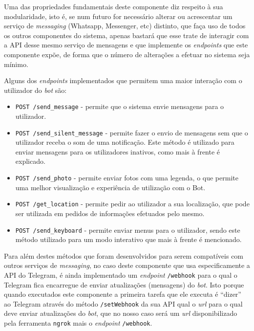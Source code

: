 \documentclass[11pt,a4paper]{article}
\begin{document}
Uma das propriedades fundamentais deste componente diz respeito à sua modularidade, isto é, se num futuro
for necessário alterar ou acrescentar um serviço de \emph{messaging} (Whatsapp, Messenger, etc) distinto,
que faça uso de todos os outros componentes do sistema, apenas bastará que esse trate de interagir com a API
desse mesmo serviço de mensagens e que implemente os \emph{endpoints} que este componente expõe, de forma
que o número de alterações a efetuar no sistema seja mínimo.

Alguns dos \emph{endpoints} implementados que permitem uma maior interação com o utilizador do \textit{bot} 
são:

\begin{itemize}
    \item \texttt{POST /send\_message} - permite que o sistema envie mensagens para o utilizador.
    \item \texttt{POST /send\_silent\_message} - permite fazer o envio de mensagens sem que o utilizador
      receba o som de uma notificação. Este método é utilizado para enviar mensagens para os utilizadores
      inativos, como mais à frente é explicado.
    \item \texttt{POST /send\_photo} - permite enviar fotos com uma legenda, o que permite uma melhor
      visualização e experiência de utilização com o Bot.
    \item \texttt{POST /get\_location} - permite pedir ao utilizador a sua localização, que pode ser
      utilizada em pedidos de informações efetuados pelo mesmo.
    \item \texttt{POST /send\_keyboard} - permite enviar menus para o utilizador, sendo este método utilizado
      para um modo interativo que mais à frente é mencionado.
\end{itemize}

Para além destes métodos que foram desenvolvidos para serem compatíveis com outros serviços de
\textit{messaging}, no caso deste componente que usa especificamente a API do Telegram, é ainda implementado
um \emph{endpoint} \texttt{/webhook} para o qual o Telegram fica encarregue de enviar atualizações
(mensagens) do \textit{bot}. Isto porque quando executados este componente a primeira tarefa que ele executa
é ``dizer'' ao Telegram através do método \texttt{/setWebhook} da sua API qual o \emph{url} para o qual deve
enviar atualizações do \textit{bot}, que no nosso caso será um \emph{url} disponibilizado pela ferramenta
\texttt{ngrok} mais o \emph{endpoint} \texttt{/webhook}.
\end{document}
